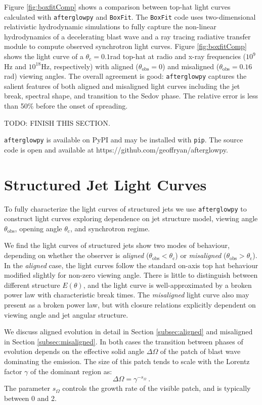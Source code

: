 \documentclass[twocolumn]{aastex62}
\newcommand{\afterglowpy}{{\tt afterglowpy}}
\newcommand{\boxfit}{{\tt BoxFit}}
\newcommand{\thobs}{\ensuremath{\theta_{\mathrm{obs}}}}
\newcommand{\thC}{\ensuremath{\theta_{\mathrm{c}}}}
\newcommand{\som}{\ensuremath{s_{\Omega}}}
\begin{document}
Figure \ref{fig:boxfitComp} shows a comparison between top-hat light curves calculated with \afterglowpy{} and \boxfit{}.  The \boxfit{} code uses two-dimensional relativistic hydrodynamic simulations to fully capture the non-linear hydrodynamics of a decelerating blast wave and a ray tracing radiative transfer module to compute observed synchrotron light curves.  Figure \ref{fig:boxfitComp} shows the light curve of a $\thC=0.1$rad top-hat at radio and x-ray frequencies ($10^9$Hz and $10^{18}$Hz, respectively) with aligned ($\thobs = 0$) and misaligned ($\thobs=0.16$rad) viewing angles.  The overall agreement is good: \afterglowpy{} captures the salient features of both aligned and misaligned light curves including the jet break, spectral shape, and transition to the Sedov phase.  The relative error is less than 50\% before the onset of spreading.

TODO: FINISH THIS SECTION.


\afterglowpy{} is available on PyPI and may be installed with {\tt pip}.  The source code is open and available at https://github.com/geoffryan/afterglowpy.

\section{Structured Jet Light Curves}\label{sec:structuredJets}

To fully characterize the light curves of structured jets we use \afterglowpy{} to construct light curves exploring dependence on jet structure model, viewing angle $\thobs$, opening angle $\thC$, and synchrotron regime.  

We find the light curves of structured jets show two modes of behaviour, depending on whether the observer is \emph{aligned} ($\thobs < \thC$) or \emph{misaligned} ($\thobs > \thC$). In the \emph{aligned} case, the light curves follow the standard on-axis top hat behaviour modified slightly for non-zero viewing angle.  There is little to distinguish between different structure $E(\theta)$, and the light curve is well-approximated by a broken power law with characteristic break times.  The \emph{misaligned} light curve also may present as a broken power law, but with closure relations explicitly dependent on viewing angle and jet angular structure.  

We discuss aligned evolution in detail in Section \ref{subsec:aligned} and misaligned in Section \ref{subsec:misaligned}.  In both cases the transition between phases of evolution depends on the effective solid angle $\Delta \Omega$ of the patch of blast wave dominating the emission.  The size of this patch tends to scale with the Lorentz factor $\gamma$ of the dominant region as:
\begin{equation}
	\Delta \Omega = \gamma^{-\som} \ .
\end{equation}
The parameter $\som$ controls the growth rate of the visible patch, and is typically between 0 and 2. 
\end{document}
